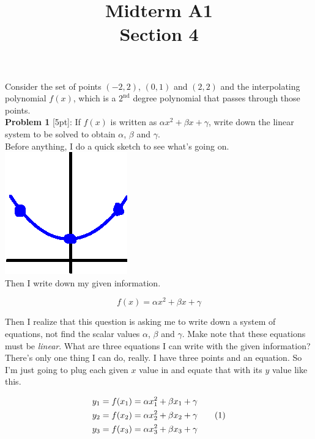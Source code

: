 \documentclass{article}
\newcommand\numberthis{\addtocounter{equation}{1}\tag{\theequation}}
\def\a{\alpha}
\def\b{\beta}
\def\c{\gamma}
\begin{document}
 
 
 
\title{
    \textmd{\Huge{Midterm A1}}\\
    \textmd{\huge{Section 4}}
}


\maketitle

Consider the set of points $(-2, 2)$, $(0, 1)$ and $(2, 2)$ and the interpolating polynomial $f(x)$, which is a $2^\text{nd}$ degree polynomial that passes through those points. \\

\textbf{Problem 1} [5pt]: If $f(x)$ is written as $\a x^2 + \b x + \c$, write down the linear system to be solved to obtain $\a$, $\b$ and $\c$. \\

Before anything, I do a quick sketch to see what's going on. \hspace*{3cm}\includegraphics[scale=0.5]{thumbSketch}\\

Then I write down my given information.

\[
f(x) = \a x^2 + \b x + \c 
\]

Then I realize that this question is asking me to write down a system of equations, not find the scalar values $\a$, $\b$ and $\c$. Make note that these equations must be \textit{linear}. What are three equations I can write with the given information? There's only one thing I can do, really. I have three points and an equation. So I'm just going to plug each given $x$ value in and equate that with its $y$ value like this.

\begin{align*}
y_1 &= f(x_1) = \a x_1^2 + \b x_1 + \c \\
y_2 &= f(x_2) = \a x_2^2 + \b x_2 + \c \numberthis \\
y_3 &= f(x_3) = \a x_3^2 + \b x_3 + \c  \\
\end{align*}
\end{document}
